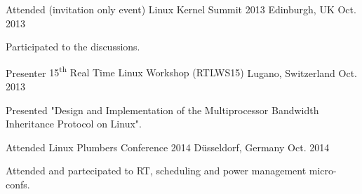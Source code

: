 \begin{cventries}
%
  \cventry
    {Attended (invitation only event)} %
    {Linux Kernel Summit 2013} %
    {Edinburgh, UK} %
    {Oct. 2013} %
    {
      \begin{cvitems} %
        \item {Participated to the discussions.}
      \end{cvitems}
    }

  \cventry
    {Presenter} %
    {15\textsuperscript{th} Real Time Linux Workshop (RTLWS15)} %
    {Lugano, Switzerland} %
    {Oct. 2013} %
    {
      \begin{cvitems} %
        \item {Presented "Design and Implementation of the Multiprocessor
		Bandwidth Inheritance Protocol on Linux".}
      \end{cvitems}
    }

%
  \cventry
    {Attended} %
    {Linux Plumbers Conference 2014} %
    {D\"{u}sseldorf, Germany} %
    {Oct. 2014} %
    {
      \begin{cvitems} %
        \item {Attended and partecipated to RT, scheduling and power management
		micro-confs.}
      \end{cvitems}
    }


\end{cventries}

